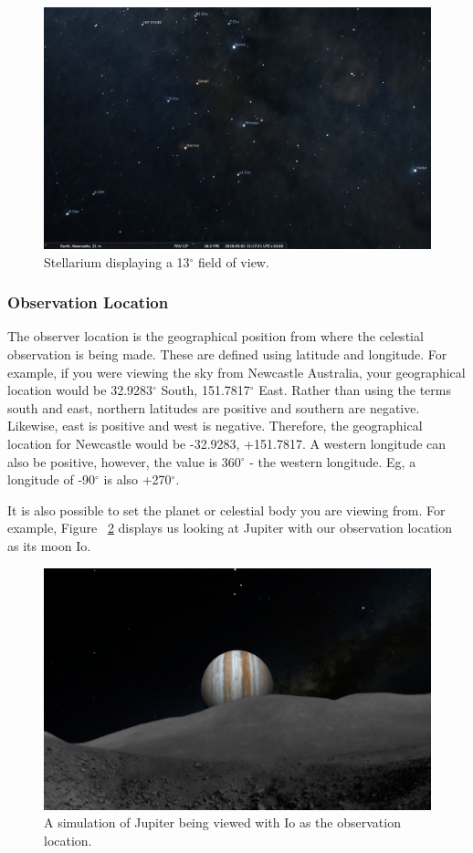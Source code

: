 \begin{figure}[htbp]
	\centering
	\includegraphics[width=1\columnwidth]{fov13}
	\caption{Stellarium displaying a 13$^{\circ}$ field of view.}
	\label{fig:fov13}
\end{figure}

\subsubsection{Observation Location}
The observer location is the geographical position from where the celestial observation is being made. These are defined using latitude and longitude. For example, if you were viewing the sky from Newcastle Australia, your geographical location would be  32.9283$^{\circ}$ South, 151.7817$^{\circ}$ East. Rather than using the terms south and east, northern latitudes are positive and southern are negative. Likewise, east is positive and west is negative. Therefore, the geographical location for Newcastle would be -32.9283, +151.7817.  A western longitude can also be positive, however, the value is 360$^{\circ}$ - the western longitude. Eg, a longitude of -90$^{\circ}$ is also +270$^{\circ}$.

It is also possible to set the planet or celestial body you are viewing from. 
For example, Figure ~\ref{fig_JupiterFromIO} displays us looking at Jupiter with our observation location as its moon Io.

\begin{figure}[ht]
	\centerline{\includegraphics[width=1\columnwidth]{JupiterFromIO.png}}
	\caption{\label{fig_JupiterFromIO}{A simulation of Jupiter being viewed with Io as the observation location.}}
\end{figure}

